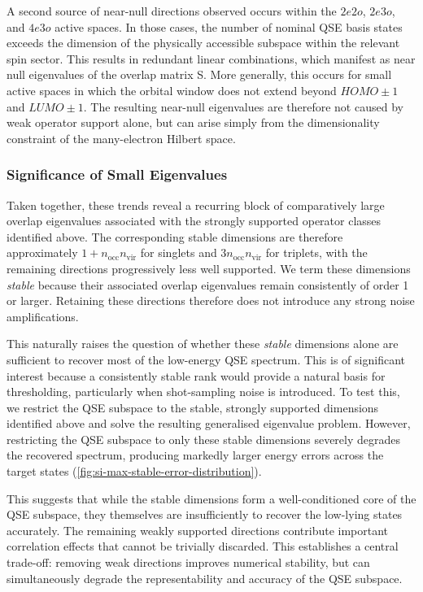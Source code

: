 A second source of near-null directions observed occurs within the $2e2o$, $2e3o$, and $4e3o$ active spaces. In those cases, the number of nominal QSE basis states exceeds the dimension of the physically accessible subspace within the relevant spin sector. 
This results in redundant linear combinations, which manifest as near null eigenvalues of the overlap matrix S. 
More generally, this occurs for small active spaces in which the orbital window does not extend beyond $HOMO\pm1$ and $LUMO\pm1$. 
The resulting near-null eigenvalues are therefore not caused by weak operator support alone, but can arise simply from the dimensionality constraint of the many-electron Hilbert space.

\subsubsection{Significance of Small Eigenvalues}
Taken together, these trends reveal a recurring block of comparatively large overlap eigenvalues associated with the strongly supported operator classes identified above.
The corresponding stable dimensions are therefore approximately $1+n_{\mathrm{occ}}n_{\mathrm{vir}}$ for singlets and $3n_{\mathrm{occ}}n_{\mathrm{vir}}$ for triplets, with the remaining directions progressively less well supported. 
We term these dimensions \textit{stable} because their associated overlap eigenvalues remain consistently of order 1 or larger. Retaining these directions therefore does not introduce any strong noise amplifications.

This naturally raises the question of whether these \textit{stable} dimensions alone are sufficient to recover most of the low-energy QSE spectrum. 
This is of significant interest because a consistently stable rank would provide a natural basis for thresholding, particularly when shot-sampling noise is introduced.
To test this, we restrict the QSE subspace to the stable, strongly supported dimensions identified above and solve the resulting generalised eigenvalue problem.
However, restricting the QSE subspace to only these stable dimensions severely degrades the recovered spectrum, producing markedly larger energy errors across the target states (\cref{fig:si-max-stable-error-distribution}).

This suggests that while the stable dimensions form a well-conditioned core of the QSE subspace, they themselves are insufficiently to recover the low-lying states accurately. 
The remaining weakly supported directions contribute important correlation effects that cannot be trivially discarded.
This establishes a central trade-off: removing weak directions improves numerical stability, but can simultaneously degrade the representability and accuracy of the QSE subspace. 

